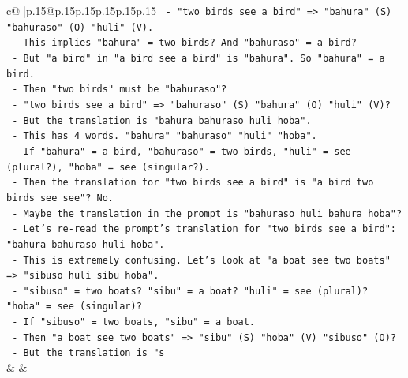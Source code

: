 \documentclass{article}
\begin{document}
{\begin{supertabular}{c@{$\;$}|p{.15\linewidth}@{}p{.15\linewidth}p{.15\linewidth}p{.15\linewidth}p{.15\linewidth}p{.15\linewidth}}
{{{\texttt{                              {-} "two birds see a bird" => "bahura" (S) "bahuraso" (O) "huli" (V).} \\
\texttt{                              {-} This implies "bahura" = two birds? And "bahuraso" = a bird?} \\
\texttt{                              {-} But "a bird" in "a bird see a bird" is "bahura". So "bahura" = a bird.} \\
\texttt{                              {-} Then "two birds" must be "bahuraso"?} \\
\texttt{                              {-} "two birds see a bird" => "bahuraso" (S) "bahura" (O) "huli" (V)?} \\
\texttt{                              {-} But the translation is "bahura bahuraso huli hoba".} \\
\texttt{                              {-} This has 4 words. "bahura" "bahuraso" "huli" "hoba".} \\
\texttt{                              {-} If "bahura" = a bird, "bahuraso" = two birds, "huli" = see (plural?), "hoba" = see (singular?).} \\
\texttt{                              {-} Then the translation for "two birds see a bird" is "a bird two birds see see"? No.} \\
\texttt{                              {-} Maybe the translation in the prompt is "bahuraso huli bahura hoba"?} \\
\texttt{                              {-} Let's re{-}read the prompt's translation for "two birds see a bird": "bahura bahuraso huli hoba".} \\
\texttt{                              {-} This is extremely confusing. Let's look at "a boat see two boats" => "sibuso huli sibu hoba".} \\
\texttt{                                {-} "sibuso" = two boats? "sibu" = a boat? "huli" = see (plural)? "hoba" = see (singular)?} \\
\texttt{                                {-} If "sibuso" = two boats, "sibu" = a boat.} \\
\texttt{                                {-} Then "a boat see two boats" => "sibu" (S) "hoba" (V) "sibuso" (O)?} \\
\texttt{                                {-} But the translation is "s} \\
            }
        }
    }
    & & \\ \\


\end{supertabular}}
\end{document}
